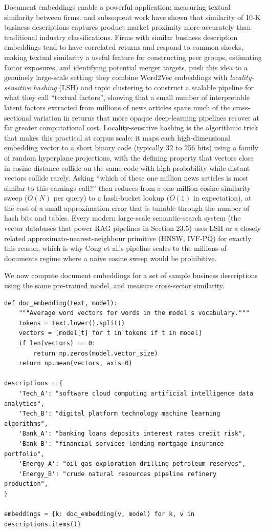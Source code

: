 Document embeddings enable a powerful application: measuring textual similarity between firms. \cite{hoberg2016text} and subsequent work have shown that similarity of 10-K business descriptions captures product market proximity more accurately than traditional industry classifications. Firms with similar business description embeddings tend to have correlated returns and respond to common shocks, making textual similarity a useful feature for constructing peer groups, estimating factor exposures, and identifying potential merger targets. \cite{cong2019textual} push this idea to a genuinely large-scale setting: they combine Word2Vec embeddings with \textit{locality-sensitive hashing} (LSH) and topic clustering to construct a scalable pipeline for what they call ``textual factors'', showing that a small number of interpretable latent factors extracted from millions of news articles spans much of the cross-sectional variation in returns that more opaque deep-learning pipelines recover at far greater computational cost. Locality-sensitive hashing is the algorithmic trick that makes this practical at corpus scale: it maps each high-dimensional embedding vector to a short binary code (typically 32 to 256 bits) using a family of random hyperplane projections, with the defining property that vectors close in cosine distance collide on the same code with high probability while distant vectors collide rarely. Asking ``which of these one million news articles is most similar to this earnings call?'' then reduces from a one-million-cosine-similarity sweep ($O(N)$ per query) to a hash-bucket lookup ($O(1)$ in expectation), at the cost of a small approximation error that is tunable through the number of hash bits and tables. Every modern large-scale semantic-search system (the vector databases that power RAG pipelines in Section 23.5) uses LSH or a closely related approximate-nearest-neighbour primitive (HNSW, IVF-PQ) for exactly this reason, which is why Cong et al.'s pipeline scales to the millions-of-documents regime where a naive cosine sweep would be prohibitive.

We now compute document embeddings for a set of sample business descriptions using the same pre-trained model, and measure cross-sector similarity.

\begin{verbatim}
def doc_embedding(text, model):
    """Average word vectors for words in the model's vocabulary."""
    tokens = text.lower().split()
    vectors = [model[t] for t in tokens if t in model]
    if len(vectors) == 0:
        return np.zeros(model.vector_size)
    return np.mean(vectors, axis=0)

descriptions = {
    'Tech_A': "software cloud computing artificial intelligence data analytics",
    'Tech_B': "digital platform technology machine learning algorithms",
    'Bank_A': "banking loans deposits interest rates credit risk",
    'Bank_B': "financial services lending mortgage insurance portfolio",
    'Energy_A': "oil gas exploration drilling petroleum reserves",
    'Energy_B': "crude natural resources pipeline refinery production",
}

embeddings = {k: doc_embedding(v, model) for k, v in descriptions.items()}
\end{verbatim}

